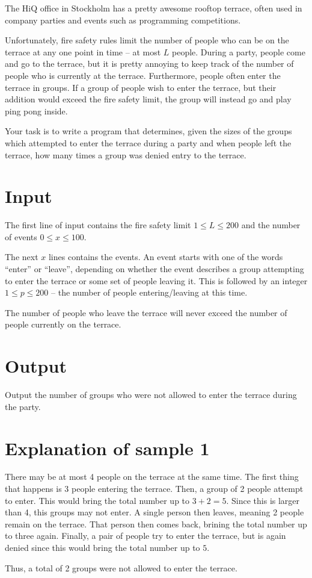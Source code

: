 The HiQ office in Stockholm has a pretty awesome rooftop terrace, often used in company parties and events such as programming competitions.

Unfortunately, fire safety rules limit the number of people who can be on the terrace at any one point in time -- at most $L$ people.
During a party, people come and go to the terrace, but it is pretty annoying to keep track of the number of people who is currently at the terrace. Furthermore, people often enter the terrace in groups. If a group of people wish to enter the terrace, but their addition would exceed the fire safety limit, the group will instead go and play ping pong inside. 

Your task is to write a program that determines, given the sizes of the groups which attempted to enter the terrace during a party and when people left the terrace, how many times a group was denied entry to the terrace.

\section*{Input}
The first line of input contains the fire safety limit $1 \le L \le 200$ and the number of events $0 \le x \le 100$.

The next $x$ lines contains the events.
An event starts with one of the words ``enter'' or ``leave'', depending on whether the event describes a group attempting to enter the terrace or some set of people leaving it.
This is followed by an integer $1 \le p \le 200$ -- the number of people entering/leaving at this time.

The number of people who leave the terrace will never exceed the number of people currently on the terrace.

\section*{Output}
Output the number of groups who were not allowed to enter the terrace during the party.

\section*{Explanation of sample 1}
There may be at most 4 people on the terrace at the same time.
The first thing that happens is 3 people entering the terrace.
Then, a group of 2 people attempt to enter.
This would bring the total number up to $3 + 2 = 5$.
Since this is larger than 4, this groups may not enter.
A single person then leaves, meaning 2 people remain on the terrace.
That person then comes back, brining the total number up to three again.
Finally, a pair of people try to enter the terrace, but is again denied since this would bring the total number up to $5$.

Thus, a total of 2 groups were not allowed to enter the terrace.

